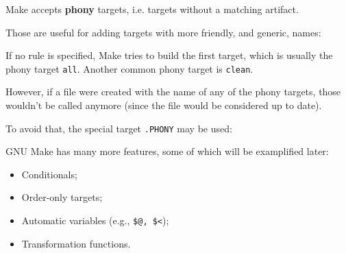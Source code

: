\begin{frame}{\secname}
    Make accepts \textbf{phony} targets, i.e. targets without a matching artifact.

    Those are useful for adding targets with more friendly, and generic, names:

    \makeTarget

\end{frame}


\begin{frame}{\secname}
    If no rule is specified, Make tries to build the first target, which is usually the phony target \texttt{all}. Another common phony target is \texttt{clean}.

    However, if a file were created with the name of any of the phony targets, those wouldn't be called anymore (since the file would be considered up to date).

    To avoid that, the special target \texttt{.PHONY} may be used:

    \makePhony

\end{frame}

\begin{frame}{\secname}
    GNU Make has many more features, some of which will be examplified later:

    \begin{itemize}
        \item Conditionals;
        \item Order-only targets;
        \item Automatic variables (e.g., \texttt{\$@, \$<});
        \item Transformation functions.
    \end{itemize}
\end{frame}
